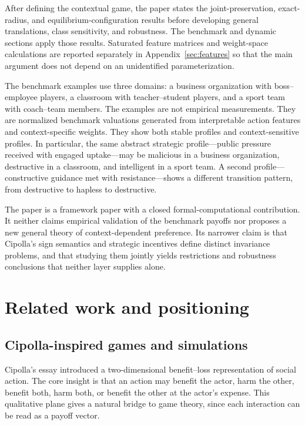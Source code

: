 \documentclass[a4paper,fleqn]{cas-dc}
\theoremstyle{remark}
\begin{document}
After defining the contextual game, the paper states the joint-preservation, exact-radius, and equilibrium-configuration results before developing general translations, class sensitivity, and robustness. The benchmark and dynamic sections apply those results. Saturated feature matrices and weight-space calculations are reported separately in Appendix~\ref{sec:features} so that the main argument does not depend on an unidentified parameterization.

The benchmark examples use three domains: a business organization with boss--employee players, a classroom with teacher--student players, and a sport team with coach--team members. The examples are not empirical measurements. They are normalized benchmark valuations generated from interpretable action features and context-specific weights. They show both stable profiles and context-sensitive profiles. In particular, the same abstract strategic profile---public pressure received with engaged uptake---may be malicious in a business organization, destructive in a classroom, and intelligent in a sport team. A second profile---constructive guidance met with resistance---shows a different transition pattern, from destructive to hapless to destructive.

The paper is a framework paper with a closed formal-computational contribution. It neither claims empirical validation of the benchmark payoffs nor proposes a new general theory of context-dependent preference. Its narrower claim is that Cipolla's sign semantics and strategic incentives define distinct invariance problems, and that studying them jointly yields restrictions and robustness conclusions that neither layer supplies alone.

\section{Related work and positioning}

\subsection{Cipolla-inspired games and simulations}

Cipolla's essay introduced a two-dimensional benefit--loss representation of social action. The core insight is that an action may benefit the actor, harm the other, benefit both, harm both, or benefit the other at the actor's expense. This qualitative plane gives a natural bridge to game theory, since each interaction can be read as a payoff vector.
\end{document}
